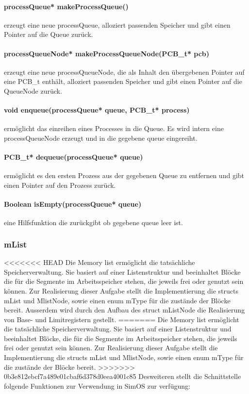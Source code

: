 \paragraph{processQueue* makeProcessQueue()} erzeugt eine neue processQueue, alloziert passenden Speicher und gibt einen Pointer auf die Queue zurück.

\paragraph{processQueueNode* makeProcessQueueNode(PCB\_t* pcb)} erzeugt eine neue processQueueNode, die als Inhalt den übergebenen Pointer auf eine PCB\_t enthält, alloziert passenden Speicher und gibt einen Pointer auf die QueueNode zurück.

\paragraph{void enqueue(processQueue* queue, PCB\_t* process)} ermöglicht das einreihen eines Processes in die Queue. Es wird intern eine processQueueNode erzeugt und in die gegebene queue eingereiht.

\paragraph{PCB\_t* dequeue(processQueue* queue)} ermöglicht es den ersten Prozess aus der gegebenen Queue zu entfernen und gibt einen Pointer auf den Prozess zurück.

\paragraph{Boolean isEmpty(processQueue* queue)} eine Hilfsfunktion die zurückgibt ob gegebene queue leer ist.


\subsubsection{mList}
<<<<<<< HEAD
Die Memory list ermöglicht die tatsächliche Speicherverwaltung. Sie basiert auf einer Listenstruktur und beeinhaltet Blöcke die für die Segmente im Arbeitsspeicher stehen, die jeweils frei oder genutzt sein können.
Zur Realisierung dieser Aufgabe stellt die Implementierung die structs mList und MlistNode, sowie einen enum mType für die zustände der Blöcke bereit. Ausserdem wird durch den Aufbau des struct mListNode die Realisierung von Base- und Limitregistern gestellt.
=======
Die Memory list ermöglicht die tatsächliche Speicherverwaltung. Sie basiert auf einer Listenstruktur und beeinhaltet Blöcke, die für die Segmente im Arbeitsspeicher stehen, die jeweils frei oder genutzt sein können.
Zur Realisierung dieser Aufgabe stellt die Implementierung die structs mList und MlistNode, sowie einen enum mType für die zustände der Blöcke bereit.
>>>>>>> 0b3e812ebcf7a489e01cbaf6d378d0eea4001c85
Desweiteren stellt die Schnittstelle folgende Funktionen zur Verwendung in SimOS zur verfügung:


